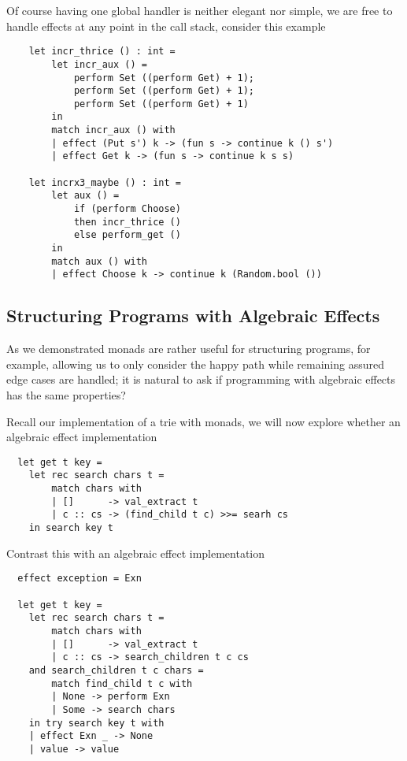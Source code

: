 Of course having one global handler is neither elegant nor simple,
we are free to handle effects at any point in the call stack,
consider this example
\begin{verbatim}
    let incr_thrice () : int =
        let incr_aux () =
            perform Set ((perform Get) + 1);
            perform Set ((perform Get) + 1);
            perform Set ((perform Get) + 1)
        in
        match incr_aux () with
        | effect (Put s') k -> (fun s -> continue k () s')
        | effect Get k -> (fun s -> continue k s s)

    let incrx3_maybe () : int =
        let aux () =
            if (perform Choose)
            then incr_thrice ()
            else perform_get ()
        in
        match aux () with
        | effect Choose k -> continue k (Random.bool ())
\end{verbatim}

\subsection{Structuring Programs with Algebraic Effects}
As we demonstrated monads are rather useful for structuring programs,
for example,
allowing us to only consider the happy path while remaining assured
edge cases are handled;
it is natural to ask if programming with algebraic effects
has the same properties?

Recall our implementation of a trie with monads,
we will now explore whether an algebraic effect implementation
\begin{verbatim}
  let get t key =
    let rec search chars t =
        match chars with
        | []      -> val_extract t
        | c :: cs -> (find_child t c) >>= searh cs
    in search key t
\end{verbatim}

Contrast this with an algebraic effect implementation

\begin{verbatim}
  effect exception = Exn

  let get t key =
    let rec search chars t =
        match chars with
        | []      -> val_extract t
        | c :: cs -> search_children t c cs
    and search_children t c chars =
        match find_child t c with
        | None -> perform Exn
        | Some -> search chars
    in try search key t with
    | effect Exn _ -> None
    | value -> value
\end{verbatim}

